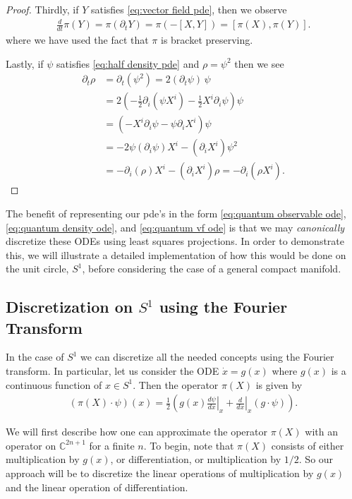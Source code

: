 \documentclass[12pt]{amsart}
\begin{document}
\begin{proof}
	Thirdly, if $Y$ satisfies \eqref{eq:vector field pde}, then we observe 
	\begin{align}
		\frac{d}{dt} \pi(Y) = \pi ( \partial_{t} Y ) = \pi( - [X,Y] ) = [\pi(X) , \pi(Y) ].
	\end{align}
	where we have used the fact that $\pi$ is bracket preserving.
	
	Lastly, if $\psi$ satisfies \eqref{eq:half density pde} and $\rho = \psi^{2}$ then we see
	\begin{align}
		\partial_{t} \rho &= \partial_{t} ( \psi^{2}) = 2 (\partial_{t} \psi ) \, \psi \\
		&= 2 \left( - \frac{1}{2} \partial_{i} (\psi X^{i}) - \frac{1}{2} X^{i} \partial_{i} \psi \right) \psi \\
		&= \left( - X^{i} \partial_{i} \psi - \psi \partial_{i} X^{i}  \right) \psi \\
		&= - 2 \psi (\partial_{i} \psi) X^{i} - (\partial_{i}X^{i}) \psi^{2}\\
		&= - \partial_{i}(\rho) X^{i} - (\partial_{i}X^{i}) \rho = - \partial_{i} ( \rho X^{i}).
	\end{align}
\end{proof}


The benefit of representing our pde's in the form \eqref{eq:quantum observable ode},\eqref{eq:quantum density ode}, and \eqref{eq:quantum vf ode}
is that we may \emph{canonically} discretize these ODEs using least squares projections.  In order to demonstrate this, we will illustrate a detailed implementation of how this would be done on the unit circle, $S^1$, before considering the case of a general compact manifold.

\subsection{Discretization on $S^1$ using the Fourier Transform}
In the case of $S^1$ we can discretize all the needed concepts using the Fourier transform.  In particular, let us consider the ODE $\dot{x} = g(x)$ where
$g(x)$ is a continuous function of $x \in S^1$.
Then the operator $\pi(X)$ is given by
\begin{align}
	\left( \pi(X) \cdot \psi \right)(x) = \frac{1}{2}
	\left( g(x) \left.\frac{d\psi}{dx}\right|_x 
	+ \left. \frac{d}{dx} \right|_x (g \cdot \psi ) \right).
\end{align}

We will first describe how one can approximate the operator $\pi(X)$ with an operator on $\mathbb{C}^{2n+1}$ for a finite $n$.  To begin, note that $\pi(X)$ consists of either multiplication by $g(x)$, or differentiation, or multiplication by $1/2$.  So our approach will be to discretize the linear operations of multiplication by $g(x)$ and the linear operation of differentiation.
\end{document}
